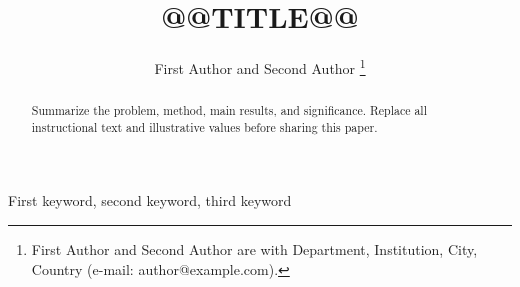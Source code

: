 \documentclass[journal,letterpaper]{IEEEtran}
\title{@@TITLE@@}
\author{First Author and Second Author%
  \thanks{First Author and Second Author are with Department, Institution,
  City, Country (e-mail: author@example.com).}}
\begin{document}
\maketitle
\begin{abstract}
Summarize the problem, method, main results, and significance. Replace all
instructional text and illustrative values before sharing this paper.
\end{abstract}
\begin{IEEEkeywords}
First keyword, second keyword, third keyword
\end{IEEEkeywords}




\end{document}
